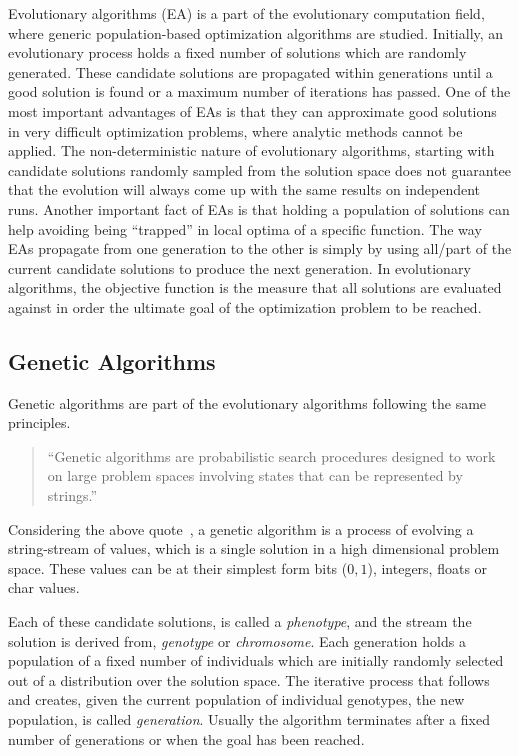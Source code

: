 Evolutionary algorithms (EA) is a part of the evolutionary computation field, where generic population-based optimization algorithms are studied. Initially, an evolutionary process holds a fixed number of solutions which are randomly generated. These candidate solutions are propagated within generations until a good solution is found or a maximum number of iterations has passed. One of the most important advantages of EAs is that they can approximate good solutions in very difficult optimization problems, where analytic methods cannot be applied. The non-deterministic nature of evolutionary algorithms, starting with candidate solutions randomly sampled from the solution space does not guarantee that the evolution will always come up with the same results on independent runs. Another important fact of EAs is that holding a population of solutions can help avoiding being ``trapped'' in local optima of a specific function. The way EAs propagate from one generation to the other is simply by using all/part of the current candidate solutions to produce the next generation. In evolutionary algorithms, the objective function is the measure that all solutions are evaluated against in order the ultimate goal of the optimization problem to be reached.




\subsection{Genetic Algorithms}
\label{geneticAlgorithms}
Genetic algorithms are part of the evolutionary algorithms following the same principles.

\begin{quote}``Genetic algorithms are probabilistic search procedures designed to work on
large problem spaces involving states that can be represented by strings.''\end{quote}

Considering the above quote~\citep{goldberg1988genetic}, a genetic algorithm is a process of evolving a string-stream of values, which is a single solution in a high dimensional problem space. These values can be at their simplest form bits ($0, 1$), integers, floats or char values.

Each of these candidate solutions, is called a \emph{phenotype}, and the stream the solution is derived from, \emph{genotype} or \emph{chromosome}. Each generation holds a population of a fixed number of individuals which are initially randomly selected out of a distribution over the solution space. The iterative process that follows and creates, given the current population of individual genotypes, the new population, is called \emph{generation}. Usually the algorithm terminates after a fixed number of generations or when the goal has been reached. 

